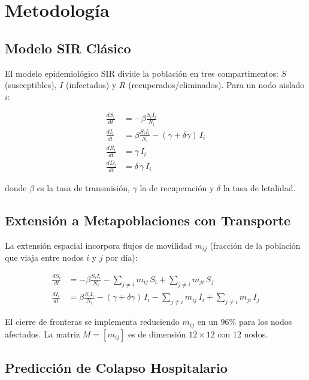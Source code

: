 \documentclass[12pt,a4paper]{article}
\begin{document}
\section{Metodología}

\subsection{Modelo SIR Clásico}

El modelo epidemiológico SIR divide la población en tres compartimentos:
$S$ (susceptibles), $I$ (infectados) y $R$ (recuperados/eliminados).
Para un nodo aislado $i$:

\begin{align}
    \frac{dS_i}{dt} &= -\beta \frac{S_i I_i}{N_i} \label{eq:sir_s}\\[4pt]
    \frac{dI_i}{dt} &= \beta \frac{S_i I_i}{N_i} - (\gamma + \delta\gamma)\,I_i \label{eq:sir_i}\\[4pt]
    \frac{dR_i}{dt} &= \gamma\,I_i \label{eq:sir_r}\\[4pt]
    \frac{dD_i}{dt} &= \delta\,\gamma\,I_i \label{eq:sir_d}
\end{align}

donde $\beta$ es la tasa de transmisión, $\gamma$ la de recuperación y $\delta$
la tasa de letalidad.

\subsection{Extensión a Metapoblaciones con Transporte}

La extensión espacial incorpora flujos de movilidad $m_{ij}$ (fracción de la población
que viaja entre nodos $i$ y $j$ por día):

\begin{align}
    \frac{dS_i}{dt} &= -\beta \frac{S_i I_i}{N_i}
        - \sum_{j \neq i} m_{ij}\,S_i
        + \sum_{j \neq i} m_{ji}\,S_j \label{eq:meta_s}\\[4pt]
    \frac{dI_i}{dt} &= \beta \frac{S_i I_i}{N_i} - (\gamma + \delta\gamma)\,I_i
        - \sum_{j \neq i} m_{ij}\,I_i
        + \sum_{j \neq i} m_{ji}\,I_j \label{eq:meta_i}
\end{align}

El cierre de fronteras se implementa reduciendo $m_{ij}$ en un $96\%$ para los nodos
afectados. La matriz $M = [m_{ij}]$ es de dimensión $12 \times 12$ con 12 nodos.

\subsection{Predicción de Colapso Hospitalario}
\end{document}

